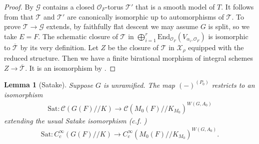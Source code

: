 \documentclass[10pt]{amsart}
\newtheorem{lemma}[theorem]{Lemma}
\theoremstyle{definition}
\numberwithin{equation}{section}
\numberwithin{equation}{subsection}
\begin{document}
\begin{proof}
By \cite[Proposition A.8.2]{KP:BruhatTits} $\mathcal{G}$ contains a closed $\mathcal{O}_F$-torus $\mathcal{T}'$ that is a smooth model of $T$. It follows from \cite[Corollary B.3.5]{Conrad:reductivegroup} that $\mathcal{T}$ and $\mathcal{T}'$ are canonically isomorphic up to automorphisms of $\mathcal{T}.$ 
To prove $\mathcal{T}\longrightarrow \mathcal{G}$ extends, by faithfully flat descent we may assume $G$ is split, so we take $E=F$. The schematic closure of $\mathcal{T}$ in $\bigoplus_{i=1}^r\mathrm{End}_{\mathcal{O}_F}(V_{\alpha_i,\mathcal{O}_F})$ is isomorphic to $\overline{\mathcal{T}}$ by its very definition. Let $Z$ be the closure of $\mathcal{T}$ in $\mathcal{X}_\rho$ equipped with the reduced structure. Then we have a finite birational morphism of integral schemes  $Z\longrightarrow\overline{\mathcal{T}}$. It is an isomorphism by  \cite[\href{https://stacks.math.columbia.edu/tag/0AB1}{Tag 0AB1}]{stacks-project}.


\end{proof}


\begin{lemma}[Satake]\label{Satake} Suppose $G$ is unramified. The map $(-)^{(P_0)}$ restricts to an isomorphism
\begin{align*}
    \mathrm{Sat}:\mathcal{C}(G(F)/\!/K)\longrightarrow \mathcal{C}(M_0(F)/\!/K_{M_0})^{W(G,A_0)}
\end{align*}
extending the usual Satake isomorphism (c.f. \cite[Theorem 7.5.3]{GH:book})
\begin{align*}
    \mathrm{Sat}:C_c^\infty(G(F)/\!/K)\longrightarrow C_c^\infty(M_0(F)/\!/K_{M_0})^{W(G,A_0)}.
\end{align*}
\end{lemma}
\end{document}
